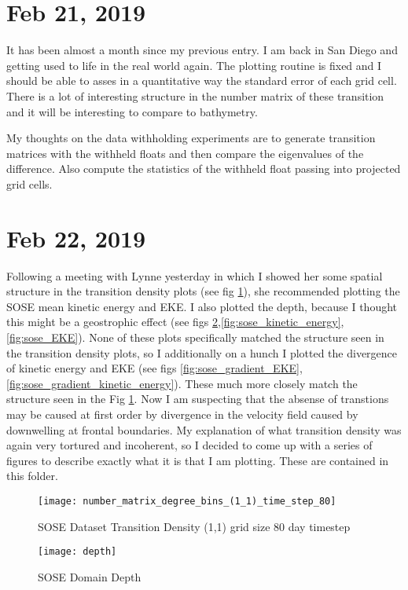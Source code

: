 \documentclass[english]{article}
\begin{document}
\section{Feb 21, 2019}
It has been almost a month since my previous entry. I am back in San Diego and getting used to life in the real world again. The plotting routine is fixed and I should be able to asses in a quantitative way the standard error of each grid cell. There is a lot of interesting structure in the number matrix of these transition and it will be interesting to compare to bathymetry.

My thoughts on the data withholding experiments are to generate transition matrices with the withheld floats and then compare the eigenvalues of the difference. Also compute the statistics of the withheld float passing into projected grid cells.

\section{Feb 22, 2019}
Following a meeting with Lynne yesterday in which I showed her some spatial structure in the transition density plots (see fig \ref{fig:sose_transition_density}), she recommended plotting the SOSE mean kinetic energy and EKE. I also plotted the depth, because I thought this might be a geostrophic effect (see figs \ref{fig:sose_depth},\ref{fig:sose_kinetic_energy},\ref{fig:sose_EKE}). None of these plots specifically matched the structure seen in the transition density plots, so I additionally on a hunch I plotted the divergence of kinetic energy and EKE (see figs \ref{fig:sose_gradient_EKE},\ref{fig:sose_gradient_kinetic_energy}). These much more closely match the structure seen in the Fig \ref{fig:sose_transition_density}. Now I am suspecting that the absense of transtions may be caused at first order by divergence in the velocity field caused by downwelling at frontal boundaries. My explanation of what transition density was again very tortured and incoherent, so I decided to come up with a series of figures to describe exactly what it is that I am plotting. These are contained in this folder.

\begin{figure}
\caption{SOSE Dataset Transition Density (1,1) grid size 80 day timestep}
\texttt{[image: number\_matrix\_degree\_bins\_(1\_1)\_time\_step\_80]}
\label{fig:sose_transition_density}
\end{figure}

\begin{figure}
\caption{SOSE Domain Depth}
\texttt{[image: depth]}
\label{fig:sose_depth}
\end{figure}
\end{document}
